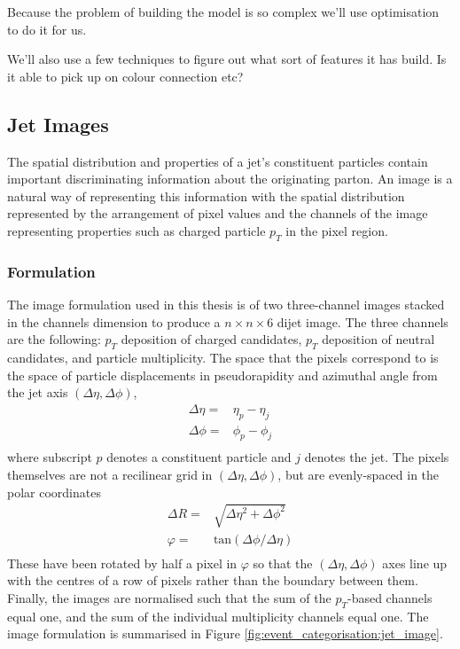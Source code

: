 Because the problem of building the model is so complex we'll use optimisation to do it for us. 

We'll also use a few techniques to figure out what sort of features it has build. Is it able to pick up on colour connection etc?

\subsection{Jet Images}
The spatial distribution and properties of a jet's constituent particles contain important discriminating information about the originating parton. 
An image is a natural way of representing this information with the spatial distribution represented by the arrangement of pixel values and the channels of the image representing properties such as charged particle $p_{T}$ in the pixel region.

\subsubsection{Formulation}
The image formulation used in this thesis is of two three-channel images stacked in the channels dimension to produce a $n\times{}n\times{}6$ dijet image.
The three channels are the following: $p_T$ deposition of charged candidates, $p_T$ deposition of neutral candidates, and particle multiplicity.
The space that the pixels correspond to is the space of particle displacements in pseudorapidity and azimuthal angle from the jet axis $(\Delta\eta,\Delta\phi)$,
\begin{equation}
    \begin{split}
        \Delta\eta =& \eta_{p} - \eta_{j} \\ 
        \Delta\phi =& \phi_{p} - \phi_{j} \\
    \end{split}
    \label{eq:event_categorisation:pixel_coords}
\end{equation}
where subscript $p$ denotes a constituent particle and $j$ denotes the jet. 
The pixels themselves are not a recilinear grid in $(\Delta\eta,\Delta\phi)$, but are evenly-spaced in the polar coordinates 
\begin{equation}
    \begin{split}
        \Delta{R} =& \sqrt{\Delta\eta^2 + \Delta\phi^2} \\
        \varphi   =& \mathrm{tan}(\Delta\phi/\Delta\eta) \\
    \end{split}
    \label{eq:event_categorisation:pixel_coords}
\end{equation}
These have been rotated by half a pixel in $\varphi$ so that the $(\Delta\eta,\Delta\phi)$ axes line up with the centres of a row of pixels rather than the boundary between them. 
Finally, the images are normalised such that the sum of the $p_T$-based channels equal one, and the sum of the individual multiplicity channels equal one. 
The image formulation is summarised in Figure \ref{fig:event_categorisation:jet_image}.

